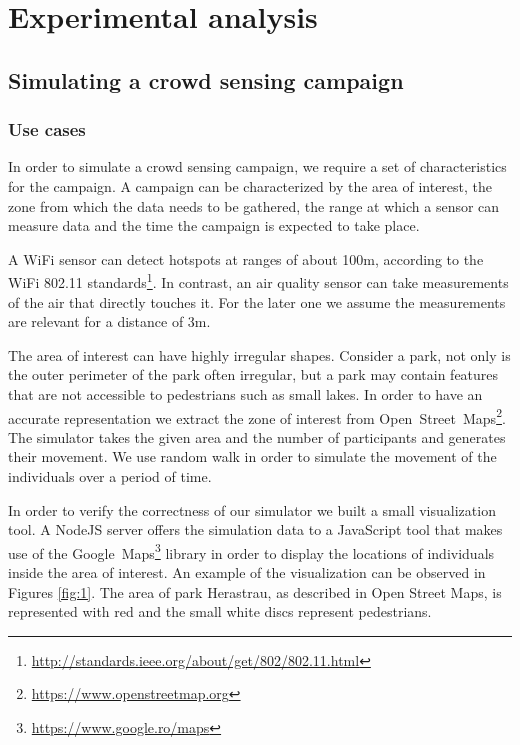 \chapter{Experimental analysis}
\label{chapter:exp}


\section{Simulating a crowd sensing campaign}
\label{sec:exp-crowd}

\subsection{Use cases}

In order to simulate a crowd sensing campaign, we require a set of characteristics for the campaign. A campaign can be characterized by the area of interest, the zone from which the data needs to be gathered, the range at which a sensor can measure data and the time the campaign is expected to take place.

A WiFi sensor can detect hotspots at ranges of about 100m, according to the WiFi 802.11 standards\footnote{\url{http://standards.ieee.org/about/get/802/802.11.html}}. In contrast, an air quality sensor can take measurements of the air that directly touches it. For the later one we assume the measurements are relevant for a distance of 3m.

The area of interest can have highly irregular shapes. Consider a park, not only is the outer perimeter of the park often irregular, but a park may contain features that are not accessible to pedestrians such as small lakes. In order to have an accurate representation we extract the zone of interest from Open~Street~Maps\footnote{\url{https://www.openstreetmap.org}}. The simulator takes the given area and the number of participants and generates their movement. We use random walk in order to simulate the movement of the individuals over a period of time.

In order to verify the correctness of our simulator we built a small visualization tool. A NodeJS server offers the simulation data to a JavaScript tool that makes use of the Google~Maps\footnote{\url{https://www.google.ro/maps}} library in order to display the locations of individuals inside the area of interest. An example of the visualization can be observed in Figures \ref{fig:1}. The area of park Herastrau, as described in Open Street Maps, is represented with red and the small white discs represent pedestrians.

